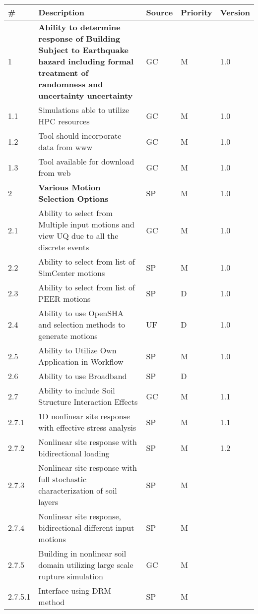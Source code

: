 \begin{longtable}{| p{} | p{} | p{} | p{} |  p{} |}
    \toprule
      \# & Description & Source & Priority & Version \\ \hline
      1 & \textbf{Ability to determine response of Building Subject to Earthquake hazard including formal treatment of randomness and uncertainty uncertainty} & GC & M  & 1.0  \\ \hline
      1.1 & Simulations able to utilize HPC resources & GC & M & 1.0 \\ \hline
      1.2 & Tool should incorporate data from www & GC & M & 1.0 \\ \hline
      1.3 & Tool available for download from web & GC & M & 1.0 \\ \hline
      2 & \textbf{Various Motion Selection Options} & SP & M & 1.0  \\ \hline
      2.1 & Ability to select from Multiple input motions and view UQ due to all the discrete events & GC & M & 1.0  \\ \hline
      2.2 & Ability to select from list of SimCenter motions & SP & M & 1.0 \\ \hline
      2.3 & Ability to select from list of PEER motions & SP & D & 1.0 \\ \hline
      2.4 & Ability to use OpenSHA and selection methods to generate motions & UF & D & 1.0 \\ \hline
      2.5 & Ability to Utilize Own Application in Workflow & SP & M & 1.0 \\ \hline
      2.6 & Ability to use Broadband & SP & D &  \\ \hline
      2.7  & Ability to include Soil Structure Interaction Effects & GC & M & 1.1 \\  \hline
      2.7.1  & 1D nonlinear site response with effective stress analysis & SP & M & 1.1  \\ \hline
      2.7.2  & Nonlinear site response with bidirectional loading & SP & M & 1.2 \\  \hline
      2.7.3  & Nonlinear site response with full stochastic characterization of soil layers & SP & M &  \\ \hline
      2.7.4 & Nonlinear site response, bidirectional different input motions  & SP & M &  \\  \hline
      2.7.5 & Building in nonlinear soil domain utilizing large scale rupture simulation & GC  & M &  \\  \hline
      2.7.5.1 & Interface using DRM method  & SP  & M &  \\  \hline

\end{longtable}
